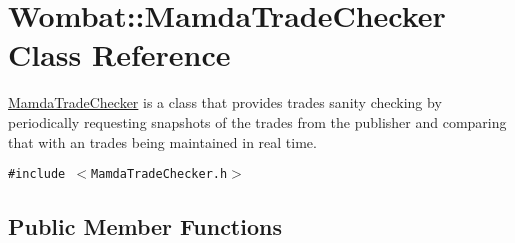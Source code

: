 \hypertarget{classWombat_1_1MamdaTradeChecker}{
\section{Wombat::Mamda\-Trade\-Checker Class Reference}
\label{classWombat_1_1MamdaTradeChecker}
}
\hyperlink{classWombat_1_1MamdaTradeChecker}{Mamda\-Trade\-Checker} is a class that provides trades sanity checking by periodically requesting snapshots of the trades from the publisher and comparing that with an trades being maintained in real time.  


{\tt \#include $<$Mamda\-Trade\-Checker.h$>$}

\subsection*{Public Member Functions}
